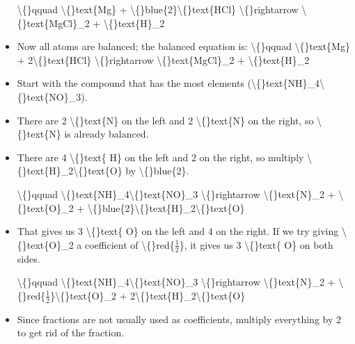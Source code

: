 \documentclass{article}
\begin{document}
\begin{itemize}
                    \textbackslash\{\}qquad
                        \textbackslash\{\}text\{Mg\} + \textbackslash\{\}blue\{2\}\textbackslash\{\}text\{HCl\} \textbackslash\{\}rightarrow \textbackslash\{\}text\{MgCl\}\_2 + \textbackslash\{\}text\{H\}\_2
  \item Now all atoms are balanced; the balanced equation is:
                    \textbackslash\{\}qquad
                        \textbackslash\{\}text\{Mg\} + 2\textbackslash\{\}text\{HCl\} \textbackslash\{\}rightarrow \textbackslash\{\}text\{MgCl\}\_2 + \textbackslash\{\}text\{H\}\_2
  \item Start with the compound that has the most elements
                    (\textbackslash\{\}text\{NH\}\_4\textbackslash\{\}text\{NO\}\_3).
  \item There are 2 \textbackslash\{\}text\{N\} on the left and
                    2 \textbackslash\{\}text\{N\} on the right, so \textbackslash\{\}text\{N\}
                    is already balanced.
  \item There are 4 \textbackslash\{\}text\{ H\} on the left and
                        2 on the right, so multiply
                        \textbackslash\{\}text\{H\}\_2\textbackslash\{\}text\{O\} by \textbackslash\{\}blue\{2\}.
                    
                    \textbackslash\{\}qquad
                        \textbackslash\{\}text\{NH\}\_4\textbackslash\{\}text\{NO\}\_3 \textbackslash\{\}rightarrow \textbackslash\{\}text\{N\}\_2 + \textbackslash\{\}text\{O\}\_2 + \textbackslash\{\}blue\{2\}\textbackslash\{\}text\{H\}\_2\textbackslash\{\}text\{O\}
  \item That gives us 3 \textbackslash\{\}text\{ O\} on the left and
                        4 on the right. If we try giving
                        \textbackslash\{\}text\{O\}\_2 a coefficient of \textbackslash\{\}red\{$\frac{1}{2}$\},
                        it gives us 3 \textbackslash\{\}text\{ O\} on both sides.
                    
                    \textbackslash\{\}qquad
                        \textbackslash\{\}text\{NH\}\_4\textbackslash\{\}text\{NO\}\_3 \textbackslash\{\}rightarrow \textbackslash\{\}text\{N\}\_2 + \textbackslash\{\}red\{$\frac{1}{2}$\}\textbackslash\{\}text\{O\}\_2 + 2\textbackslash\{\}text\{H\}\_2\textbackslash\{\}text\{O\}
  \item Since fractions are not usually used as coefficients, multiply everything by 2 to get rid of the fraction.
                    

\end{itemize}
\end{document}
